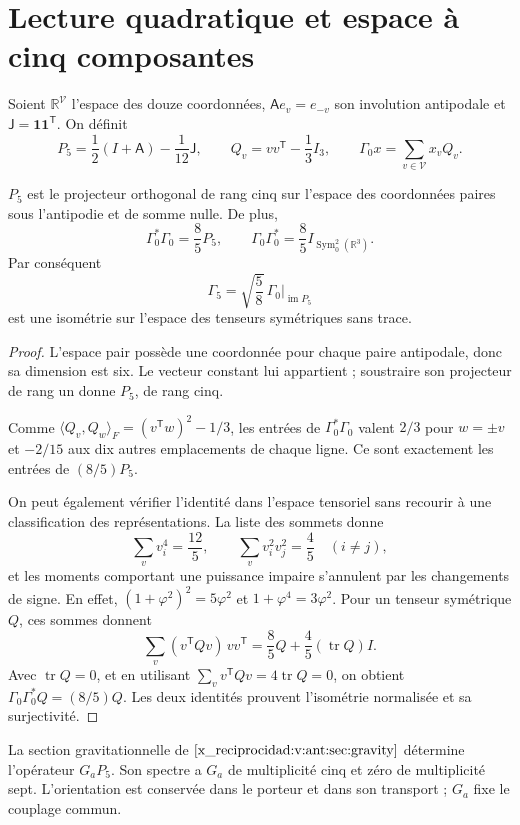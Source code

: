 \section{Lecture quadratique et espace à cinq composantes}
Soient \(\mathbb R^{\mathcal V}\) l'espace des douze coordonnées,
\(\mathsf A e_v=e_{-v}\) son involution antipodale et
\(\mathsf J=\mathbf1\mathbf1^{\mathsf T}\). On définit
\[
 P_5=\frac12(I+\mathsf A)-\frac1{12}\mathsf J,\qquad
 Q_v=vv^{\mathsf T}-\frac13I_3,\qquad
 \Gamma_0x=\sum_{v\in\mathcal V}x_vQ_v.
\]
\begin{theorem}
\label{x_reciprocidad:vii:thm:portador-pentacomponente}
\(P_5\) est le projecteur orthogonal de rang cinq sur l'espace des
coordonnées paires sous l'antipodie et de somme nulle. De plus,
\[
 \Gamma_0^*\Gamma_0=\frac85P_5,\qquad
 \Gamma_0\Gamma_0^*=\frac85I_{\operatorname{Sym}^2_0(\mathbb R^3)}.
\]
Par conséquent
\[
 \Gamma_5=\sqrt{\frac58}\,\Gamma_0|_{\operatorname{im}P_5}
\]
est une isométrie sur l'espace des tenseurs symétriques sans trace.
\end{theorem}
\begin{proof}
L'espace pair possède une coordonnée pour chaque paire antipodale, donc
sa dimension est six. Le vecteur constant lui appartient ; soustraire son
projecteur de rang un donne \(P_5\), de rang cinq.

Comme
\(\langle Q_v,Q_w\rangle_F=(v^{\mathsf T}w)^2-1/3\), les entrées
de \(\Gamma_0^*\Gamma_0\) valent \(2/3\) pour \(w=\pm v\) et
\(-2/15\) aux dix autres emplacements de chaque ligne. Ce sont
exactement les entrées de \((8/5)P_5\).

On peut également vérifier l'identité dans l'espace tensoriel sans recourir à une classification des représentations. La liste des sommets donne
\[
 \sum_vv_i^4=\frac{12}{5},\qquad
 \sum_vv_i^2v_j^2=\frac45\quad(i\ne j),
\]
et les moments comportant une puissance impaire s'annulent par les changements de signe. En effet, \((1+\varphi^2)^2=5\varphi^2\) et \(1+\varphi^4=3\varphi^2\). Pour un tenseur symétrique \(Q\), ces sommes donnent
\[
 \sum_v(v^{\mathsf T}Qv)\,vv^{\mathsf T}
 =\frac85Q+\frac45(\operatorname{tr}Q)I.
\]
Avec \(\operatorname{tr}Q=0\), et en utilisant
\(\sum_vv^{\mathsf T}Qv=4\operatorname{tr}Q=0\), on obtient
\(\Gamma_0\Gamma_0^*Q=(8/5)Q\). Les deux identités prouvent
l'isométrie normalisée et sa surjectivité.
\end{proof}

La section gravitationnelle de \(\ref{x_reciprocidad:v:ant:sec:gravity}\) détermine
l’opérateur \(G_aP_5\). Son spectre a \(G_a\) de multiplicité
cinq et zéro de multiplicité sept. L’orientation est conservée dans
le porteur et dans son transport ; \(G_a\) fixe le couplage commun.

